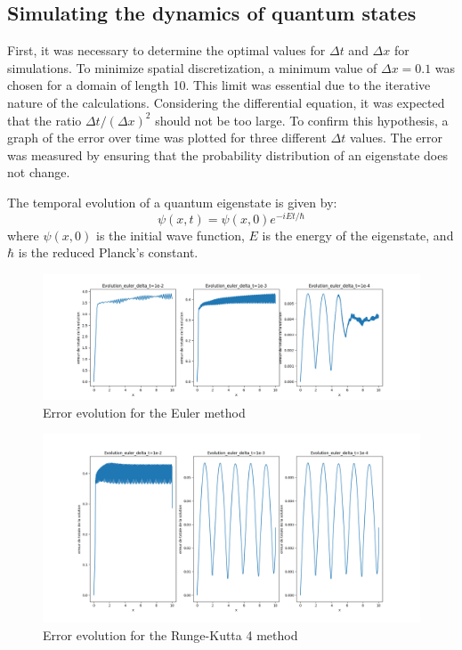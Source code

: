 \documentclass[12pt,french]{article}
\begin{document}
\subsection{Simulating the dynamics of quantum states}

First, it was necessary to determine the optimal values for \(\Delta t\) and \(\Delta x\) for simulations. To minimize spatial discretization, a minimum value of \(\Delta x = 0.1\) was chosen for a domain of length 10. This limit was essential due to the iterative nature of the calculations. Considering the differential equation, it was expected that the ratio \(\Delta t / (\Delta x)^2\) should not be too large. To confirm this hypothesis, a graph of the error over time was plotted for three different \(\Delta t\) values. The error was measured by ensuring that the probability distribution of an eigenstate does not change.

The temporal evolution of a quantum eigenstate is given by:
\[
\psi(x, t) = \psi(x, 0) e^{-i E t / \hbar}
\]
where \( \psi(x, 0) \) is the initial wave function, \( E \) is the energy of the eigenstate, and \( \hbar \) is the reduced Planck's constant.

\begin{figure}[h!]
\centering
\includegraphics[width=0.7\linewidth]{Partie_II/Euler_Precision.png}
\caption{Error evolution for the Euler method}
\label{fig:euler-error}
\end{figure}

\begin{figure}[h!]
\centering
\includegraphics[width=0.7\linewidth]{Partie_II/RK4_Precision.png}
\caption{Error evolution for the Runge-Kutta 4 method}
\label{fig:rk4-error}
\end{figure}
\end{document}

